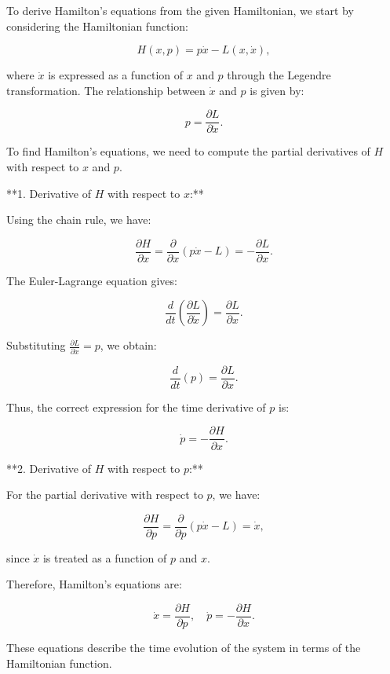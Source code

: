 To derive Hamilton's equations from the given Hamiltonian, we start by considering the Hamiltonian function:

$$
H(x, p) = p \dot{x} - L(x, \dot{x}),
$$

where \( \dot{x} \) is expressed as a function of \( x \) and \( p \) through the Legendre transformation. The relationship between \( \dot{x} \) and \( p \) is given by:

$$
p = \frac{\partial L}{\partial \dot{x}}.
$$

To find Hamilton's equations, we need to compute the partial derivatives of \( H \) with respect to \( x \) and \( p \).

**1. Derivative of \( H \) with respect to \( x \):**

Using the chain rule, we have:

$$
\frac{\partial H}{\partial x} = \frac{\partial}{\partial x} (p \dot{x} - L) = -\frac{\partial L}{\partial x}.
$$

The Euler-Lagrange equation gives:

$$
\frac{d}{dt} \left( \frac{\partial L}{\partial \dot{x}} \right) = \frac{\partial L}{\partial x}.
$$

Substituting \( \frac{\partial L}{\partial \dot{x}} = p \), we obtain:

$$
\frac{d}{dt}(p) = \frac{\partial L}{\partial x}.
$$

Thus, the correct expression for the time derivative of \( p \) is:

$$
\dot{p} = -\frac{\partial H}{\partial x}.
$$

**2. Derivative of \( H \) with respect to \( p \):**

For the partial derivative with respect to \( p \), we have:

$$
\frac{\partial H}{\partial p} = \frac{\partial}{\partial p} (p \dot{x} - L) = \dot{x},
$$

since \( \dot{x} \) is treated as a function of \( p \) and \( x \).

Therefore, Hamilton's equations are:

$$
\dot{x} = \frac{\partial H}{\partial p}, \quad \dot{p} = -\frac{\partial H}{\partial x}.
$$

These equations describe the time evolution of the system in terms of the Hamiltonian function.